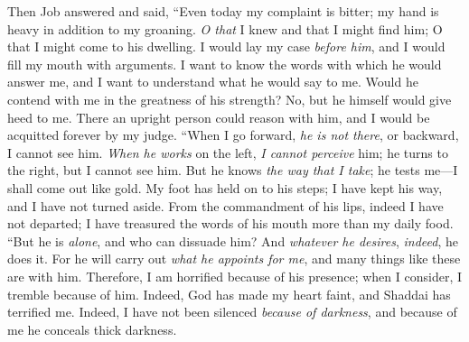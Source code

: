 \begin{biblechapter} %
 Then Job answered and said,
\verse “Even today my complaint is bitter; 
my hand is heavy in addition to my groaning.
\verse \textit{O that} I knew and that I might find him; 
O that I might come to his dwelling.
\verse I would lay my case \textit{before him}, 
and I would fill my mouth with arguments.
\verse I want to know the words with which he would answer me, 
and I want to understand what he would say to me.
\verse Would he contend with me in the greatness of his strength? 
No, but he himself would give heed to me.
\verse There an upright person could reason with him, 
and I would be acquitted forever by my judge.
\verse “When I go forward, \textit{he is not there}, 
or backward, I cannot see him.
\verse \textit{When he works} on the left, \textit{I cannot perceive} him; 
he turns to the right, but I cannot see him.
\verse But he knows \textit{the way that I take}; 
he tests me—I shall come out like gold.
\verse My foot has held on to his steps; 
I have kept his way, and I have not turned aside.
\verse From the commandment of his lips, indeed I have not departed; 
I have treasured the words of his mouth more than my daily food.
\verse “But he is \textit{alone}, and who can dissuade him? 
And \textit{whatever he desires}, \textit{indeed}, he does it.
\verse For he will carry out \textit{what he appoints for me}, 
and many things like these are with him.
\verse Therefore, I am horrified because of his presence; 
when I consider, I tremble because of him.
\verse Indeed, God has made my heart faint, 
and Shaddai has terrified me.
\verse Indeed, I have not been silenced \textit{because of darkness}, 
and because of me he conceals thick darkness.
\end{biblechapter}

